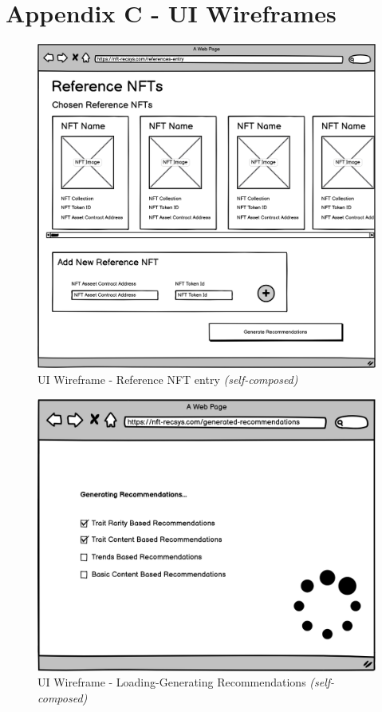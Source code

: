 \newpage
\section*{Appendix C - UI Wireframes}

\begin{figure}[h!]
\centering
\includegraphics[width=\textwidth]{images/appendix/UI Wireframes/Reference NFT entry.png}
\caption{UI Wireframe - Reference NFT entry \textit{(self-composed)}}
\end{figure}

\begin{figure}[h!]
\centering
\includegraphics[width=\textwidth]{images/appendix/UI Wireframes/Loading-Generating Recommendations.png}
\caption{UI Wireframe - Loading-Generating Recommendations \textit{(self-composed)}}
\end{figure}

